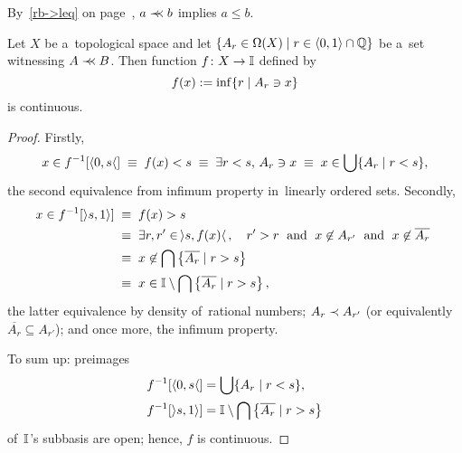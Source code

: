 \begin{rem}
  By~\ref{rb->leq} on page~\pageref{rb->leq}\thinspace, $a \prec\mkern-8mu\prec b$
  implies $a \le b$.
\end{rem}

\begin{lem} \label{cb->continuous}
  Let $X$ be a~topological space and let $\{A_r\in \Omega(X) \mid r\in \langle
  0, 1 \rangle \cap \mathbb{Q}\}$ be a~set witnessing $A \prec\mkern-8mu\prec B$.
  Then function $f\colon X \to \mathbb{I}$ defined by
  \[
    f(x) := \inf \{r \mid A_r \owns x\}
  \]
  is continuous.
\end{lem}
\begin{proof}
  Firstly,
  \[
    x\in f^{-1}[\langle 0, s \langle] \; \equiv \;
    f(x) < s \; \equiv \;
    \exists r < s, \, A_r \owns x \; \equiv \;
    x\in \bigcup \{ A_r \mid r < s \},
  \]
  the second equivalence from infimum property in~linearly ordered sets.
  Secondly,
  \begin{align*}
    x\in f^{-1}[\rangle s, 1 \rangle] \; &\equiv \;
    f(x) > s \\
    &\equiv \; \exists r, r' \in \,\rangle s, f(x) \langle\,, \quad  r' > r
    \;\text{ and }\; x\not\in A_{r'} \;\text{ and }\; x\not\in \overline{A_r}
    \; \\
    &\equiv \; x\not\in \bigcap \left\{ \overline{A_r} \mid r > s \right\} \\
    &\equiv \; x\in \mathbb{I}\setminus \bigcap \left\{ \overline{A_r} \mid r > s
    \right\},
  \end{align*}
  the latter equivalence by density of~rational numbers;
  $A_r \prec A_{r'}$ (or equivalently $\overline{A_r}\subseteq A_{r'}$);
  and once more, the infimum property.

  To sum up: preimages
  \begin{align*}
    f^{-1}[\langle 0, s \langle] &= \bigcup \{ A_r \mid r < s \}, \\
    f^{-1}[\rangle s, 1 \rangle] &= \mathbb{I}\setminus \bigcap \left\{ \overline{A_r} \mid r > s \right\}
  \end{align*}
  of~$\mathbb{I}$'s subbasis are open;
  hence, $f$ is continuous.
\end{proof}

